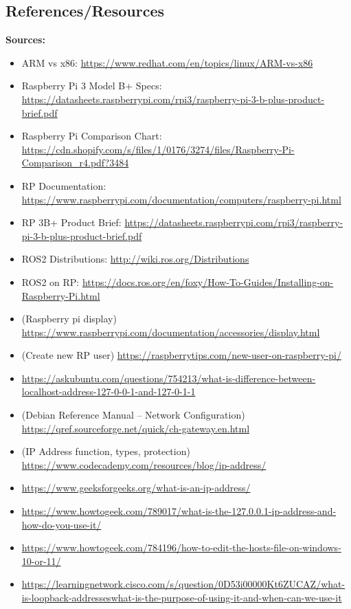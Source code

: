 \documentclass[a4paper, 10pt]{article}
\begin{document}
    \subsection{References/Resources}
        \textbf{Sources:}
        \begin{itemize}
          \item ARM vs x86: 
          \url{https://www.redhat.com/en/topics/linux/ARM-vs-x86}
          \item Raspberry Pi 3 Model B+ Specs: \url{https://datasheets.raspberrypi.com/rpi3/raspberry-pi-3-b-plus-product-brief.pdf}
          \item Raspberry Pi Comparison Chart: \url{https://cdn.shopify.com/s/files/1/0176/3274/files/Raspberry-Pi-Comparison_r4.pdf?3484}
          \item RP Documentation: \url{https://www.raspberrypi.com/documentation/computers/raspberry-pi.html}
          \item RP 3B+ Product Brief:
          \url{https://datasheets.raspberrypi.com/rpi3/raspberry-pi-3-b-plus-product-brief.pdf}
          \item ROS2 Distributions: \url{http://wiki.ros.org/Distributions}
          \item ROS2 on RP: \url{https://docs.ros.org/en/foxy/How-To-Guides/Installing-on-Raspberry-Pi.html}
          \item (Raspberry pi display) \url{https://www.raspberrypi.com/documentation/accessories/display.html}
        \item (Create new RP user) \url{https://raspberrytips.com/new-user-on-raspberry-pi/}
        \item \url{https://askubuntu.com/questions/754213/what-is-difference-between-localhost-address-127-0-0-1-and-127-0-1-1}
        \item (Debian Reference Manual – Network Configuration) \url{https://qref.sourceforge.net/quick/ch-gateway.en.html}
        \item (IP Address function, types, protection) \url{https://www.codecademy.com/resources/blog/ip-address/}
        \item \url{https://www.geeksforgeeks.org/what-is-an-ip-address/}
        \item \url{https://www.howtogeek.com/789017/what-is-the-127.0.0.1-ip-address-and-how-do-you-use-it/}
        \item \url{https://www.howtogeek.com/784196/how-to-edit-the-hosts-file-on-windows-10-or-11/}
        \item \url{https://learningnetwork.cisco.com/s/question/0D53i00000Kt6ZUCAZ/what-is-loopback-addresseswhat-is-the-purpose-of-using-it-and-when-can-we-use-it}

\end{itemize}
\end{document}

